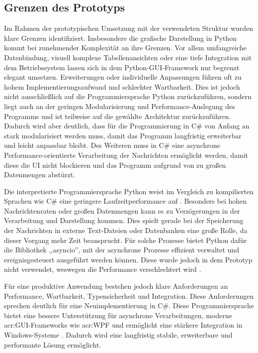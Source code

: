     \subsection{Grenzen des Prototyps}
        Im Rahmen der prototypischen Umsetzung mit der verwendeten Struktur wurden klare Grenzen identifiziert. Insbesondere die grafische Darstellung in Python kommt bei zunehmender Komplexität an ihre Grenzen.
        Vor allem umfangreiche Datenbindung, visuell komplexe Tabellenansichten oder eine tiefe Integration mit dem Betriebssystem lassen sich in dem Python-GUI-Framework nur begrenzt
        elegant umsetzen. Erweiterungen oder individuelle Anpassungen führen oft zu hohem Implementierungsaufwand und schlechter Wartbarkeit. Dies ist jedoch nicht ausschließlich auf die Programmiersprache Python zurückzuführen, sondern liegt auch an der geringen Modularisierung und Performance-Auslegung des Programms und ist teilweise auf die gewählte Architektur zurückzuführen. Dadurch wird aber deutlich, dass für die Programmierung in C\# von Anfang an stark modularisiert werden muss, damit das Programm langfristig erweiterbar und leicht anpassbar bleibt. Des Weiteren muss in C\# eine asynchrone Performance-orientierte Verarbeitung der Nachrichten  ermöglicht werden, damit diese die UI nicht blockieren und das Programm aufgrund von zu großen Datenmengen abstürzt.

        Die interpretierte Programmiersprache Python weist im Vergleich zu kompilierten Sprachen wie C\# eine geringere Laufzeitperformance auf \autocite{PythonVSCS}. Besonders bei hohen Nachrichtenraten oder großen Datenmengen kann es zu Verzögerungen in der Verarbeitung und Darstellung kommen. Dies spielt gerade bei der Speicherung der Nachrichten in externe Text-Dateien oder Datenbanken eine große Rolle, da dieser Vorgang mehr Zeit beansprucht.  Für solche Prozesse bietet Python dafür die Bibliothek ,,asyncio'', mit der asynchrone Prozesse effizient verwaltet und ereignisgesteuert ausgeführt werden können. Diese wurde jedoch in dem Prototyp nicht verwendet, weswegen die Performance verschlechtert wird \autocite{AsyncioAsynchronous}.

        Für eine produktive Anwendung bestehen jedoch klare Anforderungen an Performance, Wartbarkeit, Typensicherheit und Integration. Diese Anforderungen sprechen deutlich für eine Neuimplementierung in C\#. Diese Programmiersprache bietet eine bessere Unterstützung für asynchrone Verarbeitungen, moderne \acrshort{acr:GUI}-Frameworks wie \acrshort{acr:WPF} und ermöglicht eine stärkere Integration in Windows-Systeme \autocite{PythonVSCS}. Dadurch wird eine langfristig stabile, erweiterbare und performante Lösung ermöglicht. 

